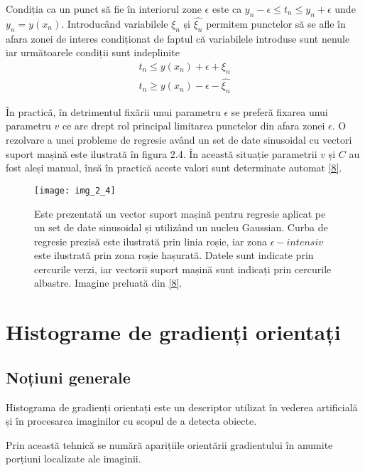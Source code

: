 Condiția ca un punct să fie în interiorul zone $ \epsilon $ este ca $y_n - \epsilon \leq t_n \leq y_n + \epsilon$ unde $y_n = y(x_n)$. Introducând variabilele $\xi_n$ și $\widehat{\xi_n}$ permitem punctelor să se afle în afara zonei de interes condiționat de faptul că variabilele introduse sunt nenule iar următoarele condiții sunt indeplinite
\begin{align}	
	t_n \leq y(x_n) + \epsilon + \xi_n
\end{align}
\begin{align}	
	t_n \geq y(x_n) - \epsilon - \widehat{\xi_n}
\end{align}

În practică, în detrimentul fixării unui parametru $\epsilon$ se preferă fixarea unui parametru $v$ ce are drept rol principal limitarea punctelor din afara zonei $\epsilon$. O rezolvare a unei probleme de regresie având un set de date sinusoidal cu vectori suport mașină este ilustrată în figura 2.4. În această situație parametrii $v$ și $C$ au fost aleși manual, însă în practică aceste valori sunt determinate automat \hyperlink{ChristopherBishop}{[8]}.
\begin{figure}[!h]
	\centering
	\texttt{[image: img\_2\_4]}
	\caption[Vector suport mașină regresie 3]{Este prezentată un vector suport mașină pentru regresie aplicat pe un set de date sinusoidal și utilizând un nucleu Gaussian. Curba de regresie prezisă este ilustrată prin linia roșie, iar zona $\epsilon - intensiv$ este ilustrată prin zona roșie hașurată. Datele sunt indicate prin cercurile verzi, iar vectorii suport mașină sunt indicați prin cercurile albastre. Imagine preluată din \hyperlink{ChristopherBishop}{[8]}.}
\end{figure}

\section{Histograme de gradienți orientați}

\subsection{Noțiuni generale}

Histograma de gradienți orientați este un descriptor utilizat în vederea artificială și în procesarea imaginilor cu scopul de a detecta obiecte. 

Prin această tehnică se numără aparițiile orientării gradientului în anumite porțiuni localizate ale imaginii.

